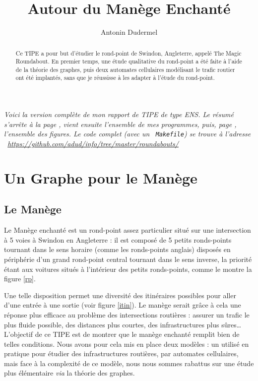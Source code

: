 \documentclass[11pt]{article}
\title{Autour du Manège Enchanté}
\date{}
\author{Antonin Dudermel}
\begin{document}

\maketitle

{\it \small
Voici la version complète de mon rapport de TIPE de type ENS.  Le résumé s'arrête à la page \pageref{finres}, vient ensuite l'ensemble de mes programmes, puis, page \pageref{figs}, l'ensemble des figures. Le code complet (avec un ~\verb+Makefile+) se trouve à l'adresse ~\url{https://github.com/adud/info/tree/master/roundabouts/}}

\begin{abstract}
	Ce TIPE a pour but d'étudier le rond-point de Swindon, Angleterre, appelé The Magic Roundabout. En premier temps, une étude qualitative du rond-point a été faite à l'aide de la théorie des graphes, puis deux automates cellulaires modélisant le trafic routier ont été implantés, sans que je réussisse à les adapter à l'étude du rond-point.

\end{abstract}

\section{Un Graphe pour le Manège}
	\subsection{Le Manège}
	
Le Manège enchanté est un rond-point assez particulier situé sur une intersection à 5 voies à Swindon en Angleterre : il est composé de 5 petits ronds-points tournant dans le sens horaire (comme les ronds-points anglais) disposés en périphérie d'un grand rond-point central tournant dans le sens inverse, la priorité étant aux voitures situés à l'intérieur des petits ronds-points, comme le montre la figure \ref{rp}.

Une telle disposition permet une diversité des itinéraires possibles pour aller d'une entrée à une sortie (voir figure \ref{itin}). Le manège serait grâce à cela une réponse plus efficace au problème des intersections routières : assurer un trafic le plus fluide possible, des distances plus courtes, des infrastructures plus sûres… L'objectif de ce TIPE est de montrer que le manège enchanté remplit bien de telles conditions. Nous avons pour cela mis en place deux modèles : un utilisé en pratique pour étudier des infrastructures routières, par automates cellulaires, mais face à la complexité de ce modèle, nous nous sommes rabattus sur une étude plus élémentaire {\it via} la théorie des graphes.
\end{document}
